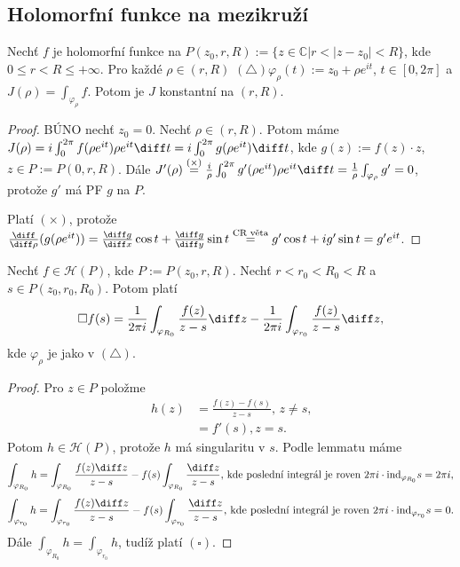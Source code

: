 
\subsection{Holomorfní funkce na mezikruží}
\begin{lemma}
Nechť $f$ je holomorfní funkce na $P(z_0,r,R):=\{z \in \mathbb{C}| r<|z-z_0|<R \}$, kde $0\leq r < R \leq + \infty$. Pro každé $\rho \in (r,R)$ $(\triangle) \varphi_\rho(t):=z_0+\rho e^{it}$, $t\in [0,2 \pi]$ a $J(\rho)=\int_{\varphi_\rho}f$. Potom je $J$ konstantní na $(r,R)$.
\end{lemma}

\begin{proof}
BÚNO nechť $z_0=0$. Nechť $\rho \in (r,R)$. Potom máme $J(\rho)=i\int_0^{2\pi}f(\rho e^{it})\rho e^{it} \diff t= \\ i\int_0^{2\pi}g(\rho e^{it})\diff t$, kde $g(z):=f(z)\cdot z$, $z \in P:=P(0,r,R)$. Dále $J'(\rho)\stackrel{(\times)}{=} \frac{i}{\rho}\int_0^{2\pi}g'(\rho e^{it})\rho e^{it} \diff t=\frac{1}{\rho}\int_{\varphi_\rho}g'=0$, protože $g'$ má PF $g$ na $P$.

Platí $(\times)$, protože $\frac{\diff}{\diff \rho}(g(\rho e^{it}))=\frac{\diff g}{\diff x} \cos t+ \frac{\diff g}{\diff y} \sin t\stackrel{\text{CR věta}}{=}g' \cos t+ i g' \sin t=g'e^{it}$.
\end{proof}

\begin{theorem}
Nechť $f \in \mathcal{H}(P)$, kde $P:=P(z_0,r,R)$. Nechť $r<r_0<R_0<R$ a $s \in P(z_0,r_0,R_0)$. Potom platí
$$\square f(s)=\frac{1}{2 \pi i}\int_{\varphi_{R_0}}\frac{f(z)}{z-s} \diff z - \frac{1}{2 \pi i}\int_{\varphi_{r_0}}\frac{f(z)}{z-s} \diff z\text{,}$$
kde $\varphi_\rho$ je jako v $(\triangle)$.
\end{theorem}

\begin{proof}
Pro $z \in P$ položme 
\begin{equation*}
    \begin{split}
h(z)&=\frac{f(z)-f(s)}{z-s}\text{, } z \neq s \text{,}\\
&=f'(s), z=s\text{.}
 \end{split}
\end{equation*}
Potom $h \in \mathcal{H}(P)$, protože $h$ má  singularitu v $s$. Podle lemmatu máme
$$
\int_{\varphi_{R_0}}h=\int_{\varphi_{R_0}}\frac{f(z) \diff z}{z-s}-f(s) \int_{\varphi_{R_0}}\frac{\diff z}{z-s}\text{, kde poslední integrál je roven }2\pi i \cdot \text{ind}_{\varphi_{R_0}}s=2 \pi i\text{,}
$$
$$
\int_{\varphi_{r_0}}h=\int_{\varphi_{r_0}}\frac{f(z) \diff z}{z-s}-f(s) \int_{\varphi_{r_0}}\frac{\diff z}{z-s}\text{, kde poslední integrál je roven }2\pi i \cdot \text{ind}_{\varphi_{r_0}}s=0{.}
$$
Dále $\int_{\varphi_{R_0}}h=\int_{\varphi_{r_0}}h$, tudíž platí $(\square)$.
\end{proof}

